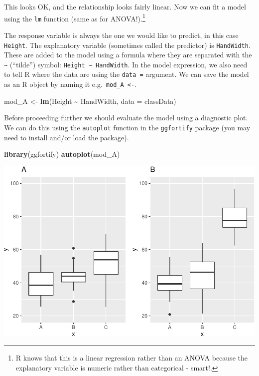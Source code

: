 \documentclass[
  a4paperpaper,
]{book}
\newenvironment{Shaded}{\begin{snugshade}}{\end{snugshade}}
\newcommand{\DataTypeTok}[1]{\textcolor[rgb]{0.13,0.29,0.53}{#1}}
\newcommand{\KeywordTok}[1]{\textcolor[rgb]{0.13,0.29,0.53}{\textbf{#1}}}
\newcommand{\NormalTok}[1]{#1}
\newcommand{\OperatorTok}[1]{\textcolor[rgb]{0.81,0.36,0.00}{\textbf{#1}}}
\newcommand{\StringTok}[1]{\textcolor[rgb]{0.31,0.60,0.02}{#1}}
\begin{document}
This looks OK, and the relationship looks fairly linear. Now we can fit a model using the \texttt{lm} function (same as for ANOVA!).\footnote{R knows that this is a linear regression rather than an ANOVA because the explanatory variable is numeric rather than categorical - smart!.}

The response variable is always the one we would like to predict, in this case \texttt{Height}. The explanatory variable (sometimes called the predictor) is \texttt{HandWidth}. These are added to the model using a formula where they are separated with the \texttt{\textasciitilde{}} (``tilde'') symbol: \texttt{Height\ \textasciitilde{}\ HandWidth}. In the model expression, we also need to tell R where the data are using the \texttt{data\ =} argument. We can save the model as an R object by naming it e.g.~\texttt{mod\_A\ \textless{}-}.

\begin{Shaded}
\begin{Highlighting}[]
\NormalTok{mod\_A \textless{}{-}}\StringTok{ }\KeywordTok{lm}\NormalTok{(Height }\OperatorTok{\textasciitilde{}}\StringTok{ }\NormalTok{HandWidth, }\DataTypeTok{data =}\NormalTok{ classData)}
\end{Highlighting}
\end{Shaded}

Before proceeding further we should evaluate the model using a diagnostic plot. We can do this using the \texttt{autoplot} function in the \texttt{ggfortify} package (you may need to install and/or load the package).

\begin{Shaded}
\begin{Highlighting}[]
\KeywordTok{library}\NormalTok{(ggfortify)}
\KeywordTok{autoplot}\NormalTok{(mod\_A)}
\end{Highlighting}
\end{Shaded}

\begin{center}\includegraphics{BB852_files/figure-latex/unnamed-chunk-213-1} \end{center}
\end{document}

